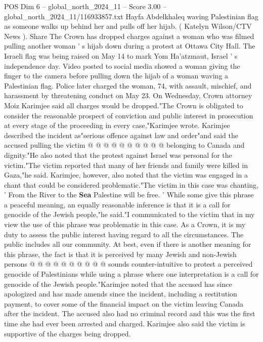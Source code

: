 \begin{textsample}{POS Dim 6 – global\_north\_2024\_11 – Score 3.00 – global\_north\_2024\_11/116933857.txt}  \label{ex:f6_pos_357}
Hayfa Abdelkhaleq waving Palestinian flag as someone walks up behind her and pulls off her hijab. ( Katelyn Wilson/CTV News ).
Share The Crown has dropped charges against a woman who was filmed pulling another woman ' s hijab down during a protest at Ottawa City Hall.
The Israeli flag was being raised on May 14 to mark Yom Ha'atzmaut, Israel ' s independence day.
Video posted to social media showed a woman giving the finger to the camera before pulling down the hijab of a woman waving a Palestinian flag.
Police later charged the woman, 74, with assault, mischief, and harassment by threatening conduct on May 23.
On Wednesday, Crown attorney Moiz Karimjee said all charges would be dropped."The Crown is obligated to consider the reasonable prospect of conviction and public interest in prosecution at every stage of the proceeding in every case,"Karimjee wrote.
Karimjee described the incident as"serious offence against law and order"and said the accused pulling the victim @ @ @ @ @ @ @ @ @ @ belonging to Canada and dignity."He also noted that the protest against Israel was personal for the victim."The victim reported that many of her friends and family were killed in Gaza,"he said.
Karimjee, however, also noted that the victim was engaged in a chant that could be considered problematic."The victim in this case was chanting, ' From the River to the \textbf{Sea} Palestine will be free. ' While some give this phrase a peaceful meaning, an equally reasonable inference is that it is a call for genocide of the Jewish people,"he said."I communicated to the victim that in my view the use of this phrase was problematic in this case.
As a Crown, it is my duty to assess the public interest having regard to all the circumstances.
The public includes all our community.
At best, even if there is another meaning for this phrase, the fact is that it is perceived by many Jewish and non-Jewish persons @ @ @ @ @ @ @ @ @ @ sounds counter-intuitive to protest a perceived genocide of Palestinians while using a phrase where one interpretation is a call for genocide of the Jewish people."Karimjee noted that the accused has since apologized and has made amends since the incident, including a restitution payment, to cover some of the financial impact on the victim leaving Canada after the incident.
The accused also had no criminal record and this was the first time she had ever been arrested and charged.
Karimjee also said the victim is supportive of the charges being dropped.

\end{textsample}
